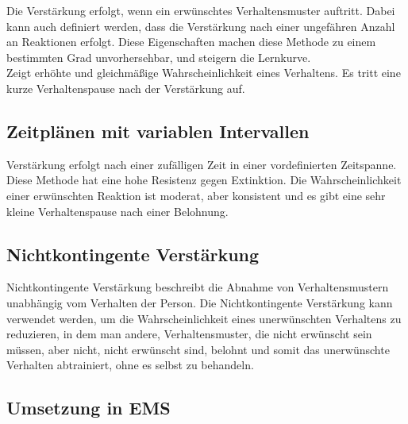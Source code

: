 		Die Verstärkung erfolgt, wenn ein erwünschtes Verhaltensmuster auftritt. Dabei kann auch definiert werden, dass die Verstärkung nach einer ungefähren Anzahl an Reaktionen erfolgt. Diese Eigenschaften machen diese Methode zu einem bestimmten Grad unvorhersehbar, und steigern die Lernkurve. \\
Zeigt erhöhte und gleichmäßige Wahrscheinlichkeit eines Verhaltens. Es tritt eine kurze Verhaltenspause nach der Verstärkung auf. \\

		\subsection{Zeitplänen mit variablen Intervallen}
		
		Verstärkung erfolgt nach einer zufälligen Zeit in einer vordefinierten Zeitspanne. \\
Diese Methode hat eine hohe Resistenz gegen Extinktion. Die Wahrscheinlichkeit einer erwünschten Reaktion ist moderat, aber konsistent und es gibt eine sehr kleine Verhaltenspause nach einer Belohnung. \\

		
		\subsection{Nichtkontingente Verstärkung}
		
		Nichtkontingente Verstärkung beschreibt die Abnahme von Verhaltensmustern unabhängig vom Verhalten der Person. Die Nichtkontingente Verstärkung kann verwendet werden, um die Wahrscheinlichkeit eines unerwünschten Verhaltens zu reduzieren, in dem man andere, Verhaltensmuster, die nicht erwünscht sein müssen, aber nicht, nicht erwünscht sind, belohnt und somit das unerwünschte Verhalten abtrainiert, ohne es selbst zu behandeln. \\
		
		\subsection{Umsetzung in EMS}
		
